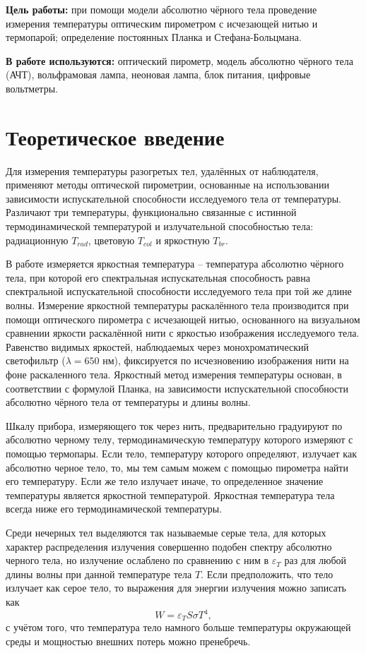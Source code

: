 \textbf{Цель работы:} при помощи модели абсолютно чёрного тела проведение измерения температуры оптическим пирометром с исчезающей нитью и термопарой; определение постоянных Планка и Стефана-Больцмана.

\textbf{В работе используются:} оптический пирометр, модель абсолютно чёрного тела (АЧТ), вольфрамовая лампа, неоновая лампа, блок питания, цифровые вольтметры.
                    
\section{Теоретическое введение}

    Для измерения температуры разогретых тел, удалённых от наблюдателя, применяют методы оптической пирометрии, основанные на использовании зависимости испускательной способности исследуемого тела от температуры. Различают три температуры, функционально связанные с истинной термодинамической температурой и излучательной способностью тела: радиационную $T_{rad}$, цветовую $T_{col}$ и яркостную $T_{br}$.

    В работе измеряется яркостная температура -- температура абсолютно чёрного тела, при которой его спектральная испускательная способность равна спектральной испускательной способности исследуемого тела при той же длине волны.
    Измерение яркостной температуры раскалённого тела производится при помощи оптического пирометра с исчезающей нитью, основанного на визуальном сравнении яркости раскалённой нити с яркостью изображения исследуемого тела. Равенство видимых яркостей, наблюдаемых через монохроматический светофильтр ($\lambda = 650$ нм), фиксируется по исчезновению изображения нити на фоне раскаленного тела.
    Яркостный метод измерения температуры основан, в соответствии с формулой Планка, на зависимости испускательной способности абсолютно чёрного тела от температуры и длины волны.

    Шкалу прибора, измеряющего ток через нить, предварительно градуируют по абсолютно черному телу, термодинамическую температуру которого измеряют с помощью термопары. Если тело, температуру которого определяют, излучает как абсолютно черное тело, то, мы тем самым можем с помощью пирометра найти его температуру. Если же тело излучает иначе, то определенное значение температуры является яркостной температурой. Яркостная температура тела всегда
    ниже его термодинамической температуры.

    Среди нечерных тел выделяются так называемые серые тела, для которых характер распределения излучения совершенно подобен спектру абсолютно черного тела, но излучение ослаблено по сравнению с ним в $\varepsilon_T$ раз для любой длины волны при данной температуре тела $T$. Если предположить, что тело излучает как серое тело, то выражения для энергии излучения можно записать как
    \begin{equation*}
        W = \varepsilon_T S \sigma T^4,
    \end{equation*}
    с учётом того, что температура тело намного больше температуры окружающей среды и мощностью внешних потерь можно пренебречь.


